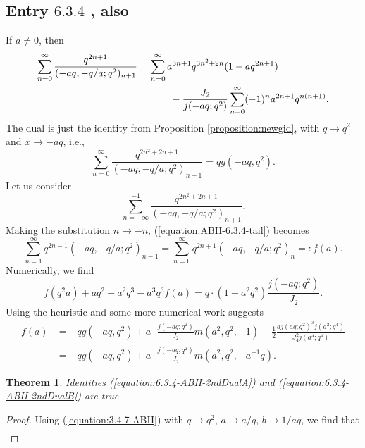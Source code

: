 \documentclass[12pt,reqno]{amsart}
\newtheorem{theorem}{Theorem}
\theoremstyle{remark}
\theoremstyle{definition}
\numberwithin{theorem}{section} \numberwithin{equation}{section}
\numberwithin{example}{section}
\begin{document}
{\subsection{Entry $6.3.4$ \cite{ABII}, also \cite[p. 37]{RLN}}
If $a\ne 0$, then
\begin{align}
\sum_{n=0}^{\infty}\frac{q^{2n+1}}{(-aq,-q/a;q^2)_{n+1}}
&=\sum_{n=0}^{\infty}a^{3n+1}q^{3n^2+2n}(1-aq^{2n+1})\label{equation:ABII-6.3.4}\\
& \ \ \ \ \ \ \ \ \ \ -\frac{J_2}{j(-aq;q^2)}\sum_{n=0}^{\infty}(-1)^na^{2n+1}q^{n(n+1)}.\notag
\end{align}
The dual is just the identity from Proposition \ref{proposition:newgid}, with $q\rightarrow q^2$ and $x\rightarrow -aq$, i.e.,
\begin{equation}
\sum_{n=0}^{\infty}\frac{q^{2n^2+2n+1}}{(-aq,-q/a;q^2)_{n+1}}=qg(-aq,q^2).\label{equation:ABII-6.3.4-dual}
\end{equation}
Let us consider 
\begin{equation}
\sum_{n=-\infty}^{-1}\frac{q^{2n^2+2n+1}}{(-aq,-q/a;q^2)_{n+1}}.\label{equation:ABII-6.3.4-tail}
\end{equation}
Making the substitution $n\rightarrow -n$, (\ref{equation:ABII-6.3.4-tail}) becomes
\begin{equation}
\sum_{n=1}^{\infty}q^{2n-1}(-aq,-q/a;q^2)_{n-1}=\sum_{n=0}^{\infty}q^{2n+1}(-aq,-q/a;q^2)_{n}=:f(a).\label{equation:ABII-6.3.4-tail-2}
\end{equation}
Numerically, we find
\begin{equation}
f(q^2a)+aq^2-a^2q^3-a^3q^3f(a)=q\cdot(1-a^2q^2)\frac{j(-aq;q^2)}{J_2}.
\end{equation}
Using the heuristic and some more numerical work suggests
\begin{align}
f(a)&=-qg(-aq,q^2)+a\cdot \frac{j(-aq;q^2)}{J_2}m(a^2,q^2,-1)-\frac{1}{2}\frac{aj(aq;q^2)^3j(a^2;q^4)}{J_4^2j(a^4;q^4)}\label{equation:6.3.4-ABII-2ndDualA}\\
&=-qg(-aq,q^2)+a\cdot \frac{j(-aq;q^2)}{J_2}m(a^2,q^2,-a^{-1}q).\label{equation:6.3.4-ABII-2ndDualB}
\end{align}
\begin{theorem} Identities (\ref{equation:6.3.4-ABII-2ndDualA}) and (\ref{equation:6.3.4-ABII-2ndDualB}) are true
\end{theorem}
\begin{proof}
Using \cite[Entry $3.4.7$]{ABII} (\ref{equation:3.4.7-ABII}) with $q\rightarrow q^2$, $a\rightarrow a/q$, $b\rightarrow 1/aq$, we find that
\begin{align*}

\end{align*}
\end{proof}}
\end{document}
